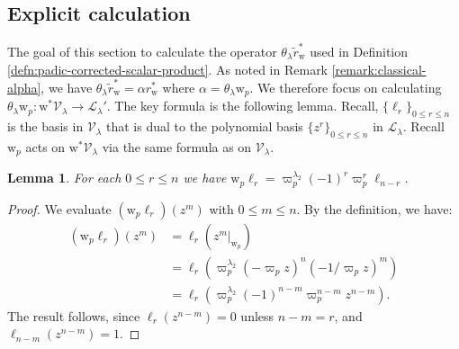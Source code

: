 \documentclass[10pt, twoside]{amsart}
\theoremstyle{plain}
\newtheorem{lemma}[theorem]{Lemma}
\theoremstyle{definition}
\theoremstyle{remark}
\numberwithin{equation}{subsection}
\def\scrl{\mathscr L}
\def\scrv{\mathscr V}
\begin{document}
\subsection{Explicit calculation}\label{subsec:adelic-calculation}
The goal of this section to calculate the operator $\theta_\lambda \widetilde{r}_{{ \boldsymbol{\mathrm{w}}}}^{\ast}$ used in Definition \ref{defn:padic-corrected-scalar-product}. As noted in Remark \ref{remark:classical-alpha}, we have $\theta_\lambda \widetilde{r}_{{ \boldsymbol{\mathrm{w}}}}^{\ast} = \alpha r_{{ \boldsymbol{\mathrm{w}}}}^{\ast}$ where $\alpha = \theta_\lambda{ \boldsymbol{\mathrm{w}}}_p $. We therefore focus on calculating $\theta_\lambda{ \boldsymbol{\mathrm{w}}}_p : { \boldsymbol{\mathrm{w}}}^{\ast}\scrv_\lambda \rightarrow \scrl_\lambda'$. The key formula is the following lemma. Recall, $\{\ell_r\}_{0\leq r \leq n}$ is the basis in $\scrv_\lambda$ that is dual to the polynomial basis $\{z^r\}_{0\leq r \leq n}$ in $\scrl_\lambda$. Recall ${ \boldsymbol{\mathrm{w}}}_p$ acts on ${ \boldsymbol{\mathrm{w}}}^{\ast}\scrv_\lambda$ via the same formula as on $\scrv_\lambda$.
\begin{lemma}\label{lemma:taup-calculation}
For each $0 \leq r \leq n$ we have ${ \boldsymbol{\mathrm{w}}}_p \ell_r = \varpi_p^{\lambda_2} (-1)^r\varpi_p^r \ell_{n-r}$.
\end{lemma}
\begin{proof}
We evaluate $({ \boldsymbol{\mathrm{w}}}_p \ell_r)(z^m)$ with $0 \leq m \leq n$. By the definition, we have:
\begin{align*}
({ \boldsymbol{\mathrm{w}}}_p \ell_r)(z^m) &= \ell_r(z^m|_{{ \boldsymbol{\mathrm{w}}}_p})\\
&= \ell_r(\varpi_p^{\lambda_2}(-\varpi_p z)^{n} (-1/\varpi_p z)^m)\\
&= \ell_r (\varpi_p^{\lambda_2} (-1)^{n-m}\varpi_p^{n-m}z^{n-m}).
\end{align*}
The result follows, since $\ell_r(z^{n-m}) = 0$ unless $n-m=r$, and $\ell_{n-m}(z^{n-m}) = 1$.
\end{proof}
\end{document}
